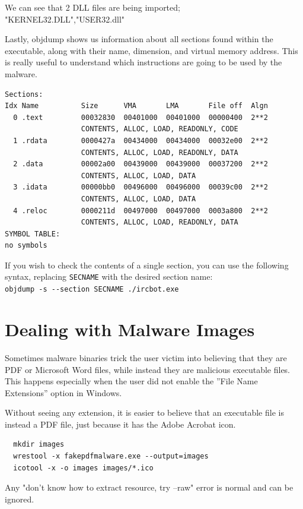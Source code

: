 \documentclass[]{project_plan}
\begin{document}
We can see that 2 DLL files are being imported;\\
"KERNEL32.DLL","USER32.dll"

Lastly, objdump shows us information about all sections found within the
executable, along with their name, dimension, and virtual memory address.
This is really useful to understand which instructions are going
to be used by the malware.

\begin{lstlisting}[basicstyle=\tiny]
Sections:
Idx Name          Size      VMA       LMA       File off  Algn
  0 .text         00032830  00401000  00401000  00000400  2**2
                  CONTENTS, ALLOC, LOAD, READONLY, CODE
  1 .rdata        0000427a  00434000  00434000  00032e00  2**2
                  CONTENTS, ALLOC, LOAD, READONLY, DATA
  2 .data         00002a00  00439000  00439000  00037200  2**2
                  CONTENTS, ALLOC, LOAD, DATA
  3 .idata        00000bb0  00496000  00496000  00039c00  2**2
                  CONTENTS, ALLOC, LOAD, DATA
  4 .reloc        0000211d  00497000  00497000  0003a800  2**2
                  CONTENTS, ALLOC, LOAD, READONLY, DATA
SYMBOL TABLE:
no symbols
\end{lstlisting}

If you wish to check the contents of a single section, you can use the following
syntax, replacing \lstinline|SECNAME| with the desired section name:\\
\lstinline|objdump -s --section SECNAME ./ircbot.exe|

\section{Dealing with Malware Images}

Sometimes malware binaries trick the user victim into believing that they
are PDF or Microsoft Word files, while instead they are malicious executable
files. This happens especially when the user did not enable the ”File Name
Extensions” option in Windows.

Without seeing any extension, it is easier to
believe that an executable file is instead a PDF file, just because it has the
Adobe Acrobat icon.

\begin{lstlisting}
  mkdir images
  wrestool -x fakepdfmalware.exe --output=images
  icotool -x -o images images/*.ico
\end{lstlisting}

Any "don’t know how to extract resource, try --raw" error is normal
and can be ignored.
\end{document}
